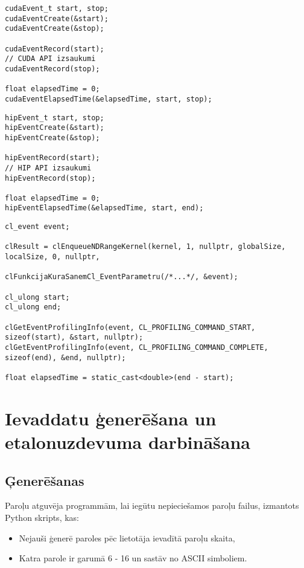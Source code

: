 \begin{lstlisting}[caption={CUDA laika mērīšanas piemērs},
    captionpos=b,
    label=lst:cuda_example]
cudaEvent_t start, stop;
cudaEventCreate(&start);
cudaEventCreate(&stop);

cudaEventRecord(start);
// CUDA API izsaukumi
cudaEventRecord(stop);

float elapsedTime = 0;
cudaEventElapsedTime(&elapsedTime, start, stop);
\end{lstlisting}

\begin{lstlisting}[caption={ROCm HIP laika mērīšanas piemērs},
    captionpos=b,
    label=lst:hip_example]
hipEvent_t start, stop;
hipEventCreate(&start);
hipEventCreate(&stop);

hipEventRecord(start);
// HIP API izsaukumi
hipEventRecord(stop);

float elapsedTime = 0;
hipEventElapsedTime(&elapsedTime, start, end);
\end{lstlisting}

\begin{lstlisting}[caption={OpenCL laika mērīšanas piemērs},
    captionpos=b,
    label=lst:cl_example]
cl_event event;

clResult = clEnqueueNDRangeKernel(kernel, 1, nullptr, globalSize, localSize, 0, nullptr,

clFunkcijaKuraSanemCl_EventParametru(/*...*/, &event);

cl_ulong start;
cl_ulong end;

clGetEventProfilingInfo(event, CL_PROFILING_COMMAND_START, sizeof(start), &start, nullptr);
clGetEventProfilingInfo(event, CL_PROFILING_COMMAND_COMPLETE, sizeof(end), &end, nullptr);

float elapsedTime = static_cast<double>(end - start);
\end{lstlisting}

\section{Ievaddatu ģenerēšana un etalonuzdevuma darbināšana}
\subsection{Ģenerēšanas}
Paroļu atguvēja programmām, lai iegūtu nepieciešamos paroļu failus, izmantots
Python skripts\cite{kursa-darbs}, kas:
\begin{itemize}
    \item Nejauši ģenerē paroles pēc lietotāja ievadītā paroļu skaita,
    \item Katra parole ir garumā 6 - 16 un sastāv no ASCII simboliem.
\end{itemize}

